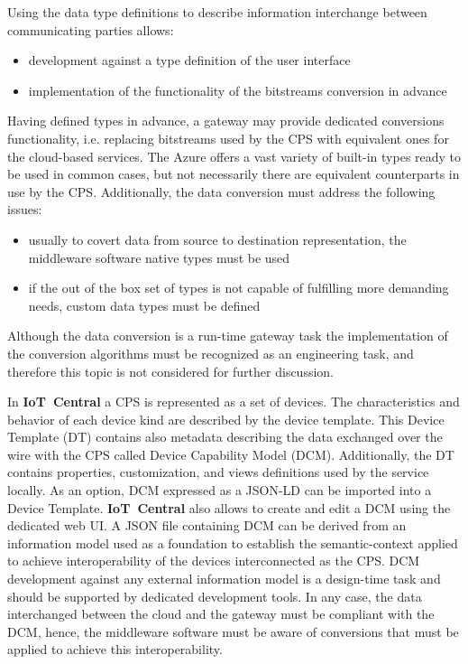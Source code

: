 \documentclass{article}
\begin{document}
Using the data type definitions to describe information interchange between communicating parties allows:

\begin{itemize}
      \item development against a type definition of the user interface
      \item implementation of the functionality of the bitstreams conversion in advance
\end{itemize}

Having defined types in advance, a gateway may provide dedicated conversions functionality, i.e. replacing bitstreams used by the CPS with equivalent ones for the cloud-based services. The Azure offers a vast variety of built-in types ready to be used in common cases, but not necessarily there are equivalent counterparts in use by the CPS. Additionally, the data conversion must address the following issues:

\begin{itemize}
      \item usually to covert data from source to destination representation, the middleware software native types must be used
      \item if the out of the box set of types is not capable of fulfilling more demanding needs, custom data types must be defined
\end{itemize}

Although the data conversion is a run-time gateway task the implementation of the conversion algorithms must be recognized as an engineering task, and therefore this topic is not considered for further discussion.

In \textbf{IoT\ Central} a CPS is represented as a set of devices. The characteristics and behavior of each device kind are described by the device template. This Device Template (DT) contains also metadata describing the data exchanged over the wire with the CPS called Device Capability Model (DCM). Additionally, the DT contains properties, customization, and views definitions used by the service locally. As an option, DCM expressed as a JSON-LD can be imported into a Device Template. \textbf{IoT\ Central} also allows to create and edit a DCM using the dedicated web UI. A JSON file containing DCM can be derived from an information model used as a foundation to establish the semantic-context applied to achieve interoperability of the devices interconnected as the CPS. DCM development against any external information model is a design-time task and should be supported by dedicated development tools. In any case, the data interchanged between the cloud and the gateway must be compliant with the DCM, hence, the middleware software must be aware of conversions that must be applied to achieve this interoperability.
\end{document}
